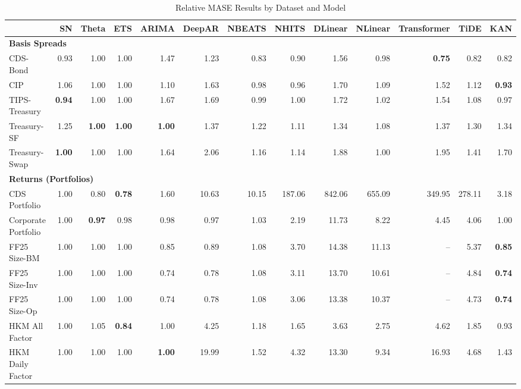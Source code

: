 
\begin{table}[htbp]
\centering
\caption{Relative MASE Results by Dataset and Model}
\label{tab:relative_mase_results}
\scriptsize
\setlength{\tabcolsep}{1.5pt}
\renewcommand{\arraystretch}{0.9}
\begin{tabular}{@{}lrrrrrrrrrrrr@{}}
\toprule
 & SN & Theta & ETS & ARIMA & DeepAR & NBEATS & NHITS & DLinear & NLinear & Transformer & TiDE & KAN \\
\midrule
\multicolumn{13}{l}{\textbf{Basis Spreads}} \\
CDS-Bond & 0.93 & 1.00 & 1.00 & 1.47 & 1.23 & 0.83 & 0.90 & 1.56 & 0.98 & \textbf{0.75} & 0.82 & 0.82 \\
CIP & 1.06 & 1.00 & 1.00 & 1.10 & 1.63 & 0.98 & 0.96 & 1.70 & 1.09 & 1.52 & 1.12 & \textbf{0.93} \\
TIPS-Treasury & \textbf{0.94} & 1.00 & 1.00 & 1.67 & 1.69 & 0.99 & 1.00 & 1.72 & 1.02 & 1.54 & 1.08 & 0.97 \\
Treasury-SF & 1.25 & \textbf{1.00} & \textbf{1.00} & \textbf{1.00} & 1.37 & 1.22 & 1.11 & 1.34 & 1.08 & 1.37 & 1.30 & 1.34 \\
Treasury-Swap & \textbf{1.00} & 1.00 & 1.00 & 1.64 & 2.06 & 1.16 & 1.14 & 1.88 & 1.00 & 1.95 & 1.41 & 1.70 \\
\midrule
\multicolumn{13}{l}{\textbf{Returns (Portfolios)}} \\
CDS Portfolio & 1.00 & 0.80 & \textbf{0.78} & 1.60 & 10.63 & 10.15 & 187.06 & 842.06 & 655.09 & 349.95 & 278.11 & 3.18 \\
Corporate Portfolio & 1.00 & \textbf{0.97} & 0.98 & 0.98 & 0.97 & 1.03 & 2.19 & 11.73 & 8.22 & 4.45 & 4.06 & 1.00 \\
FF25 Size-BM & 1.00 & 1.00 & 1.00 & 0.85 & 0.89 & 1.08 & 3.70 & 14.38 & 11.13 & -- & 5.37 & \textbf{0.85} \\
FF25 Size-Inv & 1.00 & 1.00 & 1.00 & 0.74 & 0.78 & 1.08 & 3.11 & 13.70 & 10.61 & -- & 4.84 & \textbf{0.74} \\
FF25 Size-Op & 1.00 & 1.00 & 1.00 & 0.74 & 0.78 & 1.08 & 3.06 & 13.38 & 10.37 & -- & 4.73 & \textbf{0.74} \\
HKM All Factor & 1.00 & 1.05 & \textbf{0.84} & 1.00 & 4.25 & 1.18 & 1.65 & 3.63 & 2.75 & 4.62 & 1.85 & 0.93 \\
HKM Daily Factor & 1.00 & 1.00 & 1.00 & \textbf{1.00} & 19.99 & 1.52 & 4.32 & 13.30 & 9.34 & 16.93 & 4.68 & 1.43 \\

\end{tabular}
\end{table}
